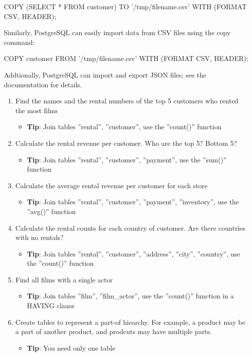 \begin{sqlcode}
COPY (SELECT * FROM customer) 
  TO '/tmp/filename.csv' 
  WITH (FORMAT CSV, HEADER);
\end{sqlcode}

Similarly, PostgreSQL can easily import data from CSV files using the copy command:

\begin{sqlcode}
COPY customer 
  FROM '/tmp/filename.csv' 
  WITH (FORMAT CSV, HEADER);
\end{sqlcode}

Addtionally, PostgreSQL can import and export JSON files; see the documentation for details.

\begin{exercisebox}
\begin{enumerate}
  \item Find the names and the rental numbers of the top 5 customers who rented the most films
  \begin{itemize}
    \item \textbf{Tip}: Join tables ''rental'', ''customer'', use the ''count()'' function
  \end{itemize}
  \item Calculate the rental revenue per customer. Who are the top 5? Bottom 5?
  \begin{itemize}
    \item \textbf{Tip}: Join tables ''rental'', ''customer'', ''payment'', use the ''sum()'' function
  \end{itemize}
  \item Calculate the average rental revenue per customer for each store
  \begin{itemize}
    \item \textbf{Tip}: Join tables ''rental'', ''customer'', ''payment'', ''inventory'', use the ''avg()'' function
  \end{itemize}
  \item Calculate the rental counts for each country of customer. Are there countries with no rentals?
  \begin{itemize}
    \item \textbf{Tip}: Join tables ''rental'', ''customer'', ''address'', ''city'', ''country'', use the ''count()'' function
  \end{itemize}
  \item Find all films with a single actor
  \begin{itemize}
    \item \textbf{Tip}: Join tables ''film'', ''film\_actor'', use the ''count()'' function in a HAVING clause
  \end{itemize}
  \item Create tables to represent a part-of hiearchy. For example, a product may be a part of another product, and prodcuts may have multiple parts.
  \begin{itemize}
    \item \textbf{Tip}: You need only one table
  \end{itemize}
\end{enumerate}
\end{exercisebox}


